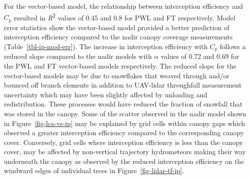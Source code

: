 \documentclass[
  letterpaper,
]{tex/uofsthesis-cs}
\begin{document}
For the vector-based model, the relationship between interception
efficiency and \(C_p\) resulted in \emph{R}\textsuperscript{2} values of
0.45 and 0.8 for PWL and FT respectively. Model error statistics show
the vector-based model provided a better prediction of interception
efficiency compared to the nadir canopy coverage measurements
(Table~\ref{tbl-ip-mod-err}). The increase in interception efficiency
with \(C_p\) follows a reduced slope compared to the nadir models with
\(\alpha\) values of 0.72 and 0.69 for the PWL and FT vector-based
models respectively. The reduced slope for the vector-based models may
be due to snowflakes that weaved through and/or bounced off branch
elements in addition to UAV-lidar throughfall measurement uncertainty
which may have been slightly affected by unloading and redistribution.
These processes would have reduced the fraction of snowfall that was
stored in the canopy. Some of the scatter observed in the nadir model
shown in Figure~\ref{fig-lca-vs-ip} may be explained by grid cells
within canopy gaps which observed a greater interception efficiency
compared to the corresponding canopy cover. Conversely, grid cells where
interception efficiency is less than the canopy cover, may be affected
by non-vertical trajectory hydrometeors making their way underneath the
canopy as observed by the reduced interception efficiency on the
windward edges of individual trees in Figure~\ref{fig-lidar-tf-ip}.

\pagebreak
\end{document}
